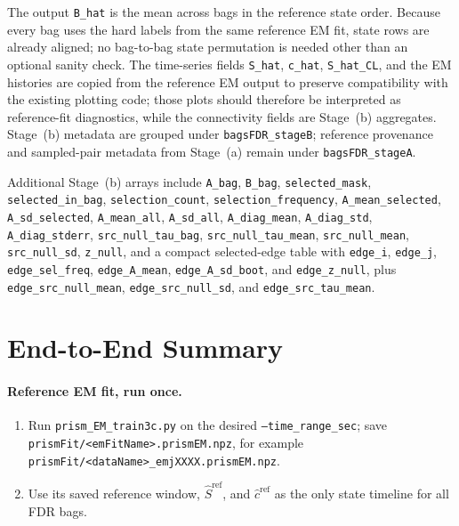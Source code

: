 \documentclass[11pt]{article}
\begin{document}
The output \texttt{B\_hat} is the mean across bags in the reference state
order. Because every bag uses the hard labels from the same reference EM fit,
state rows are already aligned; no bag-to-bag state permutation is needed
other than an optional sanity check. The time-series fields
\texttt{S\_hat}, \texttt{c\_hat}, \texttt{S\_hat\_CL}, and the EM histories
are copied from the reference EM output to preserve compatibility with the
existing plotting code; those plots should therefore be interpreted as
reference-fit diagnostics, while the connectivity fields are Stage~(b)
aggregates. Stage~(b) metadata are grouped under
\texttt{bagsFDR\_stageB}; reference provenance and sampled-pair metadata
from Stage~(a) remain under \texttt{bagsFDR\_stageA}.

Additional Stage~(b) arrays include \texttt{A\_bag},
\texttt{B\_bag},
\texttt{selected\_mask}, \texttt{selected\_in\_bag},
\texttt{selection\_count}, \texttt{selection\_frequency},
\texttt{A\_mean\_selected}, \texttt{A\_sd\_selected},
\texttt{A\_mean\_all}, \texttt{A\_sd\_all}, \texttt{A\_diag\_mean},
\texttt{A\_diag\_std}, \texttt{A\_diag\_stderr}, \texttt{src\_null\_tau\_bag},
\texttt{src\_null\_tau\_mean}, \texttt{src\_null\_mean},
\texttt{src\_null\_sd}, \texttt{z\_null}, and a compact selected-edge table
with \texttt{edge\_i}, \texttt{edge\_j}, \texttt{edge\_sel\_freq},
\texttt{edge\_A\_mean}, \texttt{edge\_A\_sd\_boot}, and
\texttt{edge\_z\_null}, plus \texttt{edge\_src\_null\_mean},
\texttt{edge\_src\_null\_sd}, and \texttt{edge\_src\_tau\_mean}.

\section{End-to-End Summary}

\paragraph{Reference EM fit, run once.}
\begin{enumerate}
  \item Run \texttt{prism\_EM\_train3c.py} on the desired
  \texttt{--time\_range\_sec}; save
  \texttt{prismFit/<emFitName>.prismEM.npz}, for example
  \texttt{prismFit/<dataName>\_emjXXXX.prismEM.npz}.
  \item Use its saved reference window, \(\hat S^{\text{ref}}\), and
  \(\hat c^{\text{ref}}\) as the only state timeline for all FDR bags.
\end{enumerate}
\end{document}
